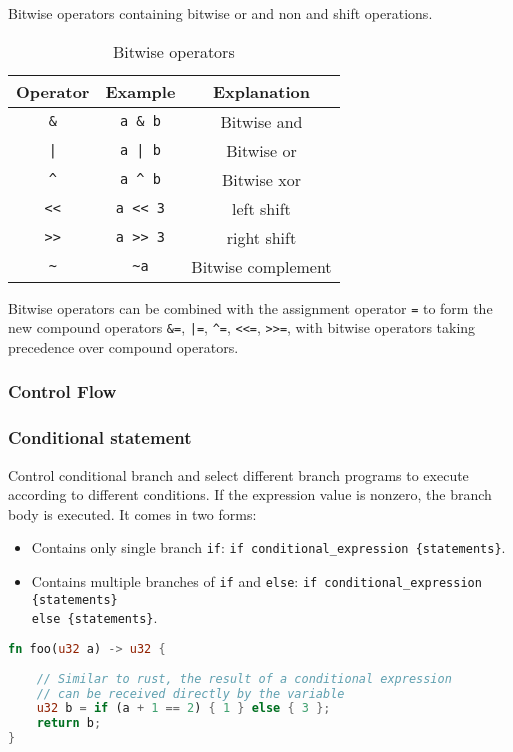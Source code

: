 Bitwise operators containing bitwise or and non and shift operations.
\begin{table}
\centering
\begin{tabular}{c|c|c}
    Operator & Example & Explanation \\ \hline
    \verb|&| & \verb|a & b| & Bitwise and \\
    \verb!|! & \verb!a | b! & Bitwise or \\
    \verb|^| & \verb|a ^ b| & Bitwise xor \\
    \verb|<<| & \verb|a << 3| & left shift  \\
    \verb|>>| & \verb|a >> 3| & right shift  \\
    \verb|~| & \verb|~a| & Bitwise complement \\
\end{tabular}
\caption{Bitwise operators}
\end{table}

Bitwise operators can be combined with the assignment operator \verb|=| to form the new compound operators \verb|&=|, \verb!|=!, \verb|^=|, \verb|<<=|, \verb|>>=|, 
with bitwise operators taking precedence over compound operators.

\subsubsection{Control Flow}

\subsubsection*{Conditional statement}

Control conditional branch and select different branch programs to execute according to different conditions. 
If the expression value is nonzero, the branch body is executed.
It comes in two forms:

\begin{itemize}
    \item Contains only single branch \verb|if|: \verb|if conditional_expression {statements}|.
    \item Contains multiple branches of \verb|if| and \verb|else|: 
    \verb|if conditional_expression {statements}| \\
    \verb|else {statements}|.

\end{itemize}

\begin{lstlisting}[language=rust]
fn foo(u32 a) -> u32 {
    
    // Similar to rust, the result of a conditional expression 
    // can be received directly by the variable
    u32 b = if (a + 1 == 2) { 1 } else { 3 };
    return b;
}
\end{lstlisting}

